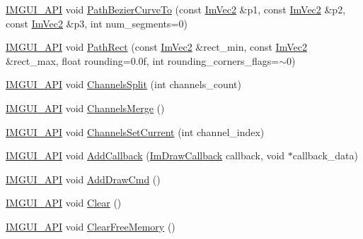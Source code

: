 \begin{DoxyCompactItemize}
\item 
\mbox{\hyperlink{imgui_8h_a43829975e84e45d1149597467a14bbf5}{I\+M\+G\+U\+I\+\_\+\+A\+PI}} void \mbox{\hyperlink{struct_im_draw_list_a495ca7dd4fd5a898e2414658321f4b18}{Path\+Bezier\+Curve\+To}} (const \mbox{\hyperlink{struct_im_vec2}{Im\+Vec2}} \&p1, const \mbox{\hyperlink{struct_im_vec2}{Im\+Vec2}} \&p2, const \mbox{\hyperlink{struct_im_vec2}{Im\+Vec2}} \&p3, int num\+\_\+segments=0)
\item 
\mbox{\hyperlink{imgui_8h_a43829975e84e45d1149597467a14bbf5}{I\+M\+G\+U\+I\+\_\+\+A\+PI}} void \mbox{\hyperlink{struct_im_draw_list_a1b63e7c7bbb70f8a7be2b227a3d3f802}{Path\+Rect}} (const \mbox{\hyperlink{struct_im_vec2}{Im\+Vec2}} \&rect\+\_\+min, const \mbox{\hyperlink{struct_im_vec2}{Im\+Vec2}} \&rect\+\_\+max, float rounding=0.\+0f, int rounding\+\_\+corners\+\_\+flags=$\sim$0)
\item 
\mbox{\hyperlink{imgui_8h_a43829975e84e45d1149597467a14bbf5}{I\+M\+G\+U\+I\+\_\+\+A\+PI}} void \mbox{\hyperlink{struct_im_draw_list_a426f124ba049bed2d38c850c65f9f917}{Channels\+Split}} (int channels\+\_\+count)
\item 
\mbox{\hyperlink{imgui_8h_a43829975e84e45d1149597467a14bbf5}{I\+M\+G\+U\+I\+\_\+\+A\+PI}} void \mbox{\hyperlink{struct_im_draw_list_a2ed82c3f663cda520c90c55b94196274}{Channels\+Merge}} ()
\item 
\mbox{\hyperlink{imgui_8h_a43829975e84e45d1149597467a14bbf5}{I\+M\+G\+U\+I\+\_\+\+A\+PI}} void \mbox{\hyperlink{struct_im_draw_list_a7de44b9fdfce65f32063ecad9306a191}{Channels\+Set\+Current}} (int channel\+\_\+index)
\item 
\mbox{\hyperlink{imgui_8h_a43829975e84e45d1149597467a14bbf5}{I\+M\+G\+U\+I\+\_\+\+A\+PI}} void \mbox{\hyperlink{struct_im_draw_list_a14073d60ef9db9dc663dc7717a4893a5}{Add\+Callback}} (\mbox{\hyperlink{imgui_8h_a232a477233f9e3ab7640720bf94674de}{Im\+Draw\+Callback}} callback, void $\ast$callback\+\_\+data)
\item 
\mbox{\hyperlink{imgui_8h_a43829975e84e45d1149597467a14bbf5}{I\+M\+G\+U\+I\+\_\+\+A\+PI}} void \mbox{\hyperlink{struct_im_draw_list_a846714bb0321c6f1f908767abc8559e6}{Add\+Draw\+Cmd}} ()
\item 
\mbox{\hyperlink{imgui_8h_a43829975e84e45d1149597467a14bbf5}{I\+M\+G\+U\+I\+\_\+\+A\+PI}} void \mbox{\hyperlink{struct_im_draw_list_ac422590c71dc5593aea52f65793aee81}{Clear}} ()
\item 
\mbox{\hyperlink{imgui_8h_a43829975e84e45d1149597467a14bbf5}{I\+M\+G\+U\+I\+\_\+\+A\+PI}} void \mbox{\hyperlink{struct_im_draw_list_a8b2686e006f57c554b709dfc47e2ad63}{Clear\+Free\+Memory}} ()

\end{DoxyCompactItemize}
